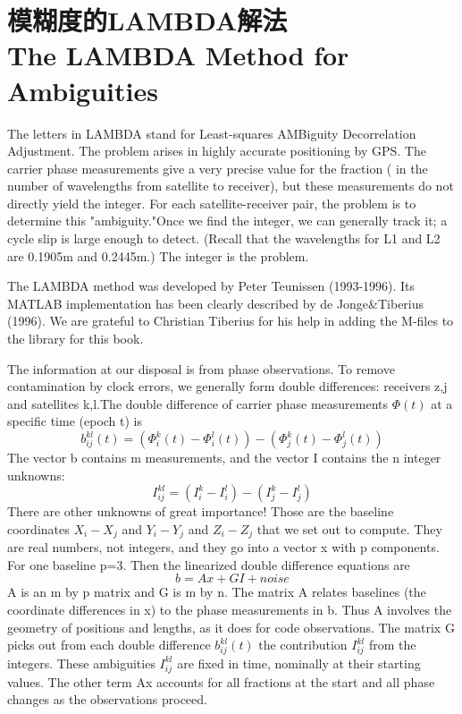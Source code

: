 \section[模糊度的LAMBDA解法]{模糊度的LAMBDA解法\\The LAMBDA Method for Ambiguities}
The letters in LAMBDA stand for Least-squares AMBiguity Decorrelation Adjustment. The problem arises in highly accurate positioning by GPS. The carrier phase measurements give a very precise value for the fraction ( in the number of wavelengths from satellite to receiver), but these measurements do not directly yield the integer. For each satellite-receiver pair, the problem is to determine this "ambiguity."Once we find the integer, we can generally track it; a cycle slip is large enough to detect. (Recall that the wavelengths for L1 and L2 are 0.1905m and 0.2445m.) The integer is the problem.

The LAMBDA method was developed by Peter Teunissen (1993-1996). Its MATLAB implementation has been clearly described by de Jonge\&Tiberius (1996). We are grateful to Christian Tiberius for his help in adding the M-files to the library for this book.

The information at our disposal is from phase observations. To remove contamination by clock errors, we generally form double differences: receivers z,j and satellites k,l.The double difference of carrier phase measurements $\Phi(t)$ at a specific time (epoch t) is
\begin{equation}
b_{ij}^{kl}(t)=(\Phi_{i}^{k}(t)-\Phi_{i}^{l}(t))-(\Phi_{j}^{k}(t)-\Phi_{j}^{l}(t))
\end{equation}
The vector b contains m measurements, and the vector I contains the n integer unknowns:
\begin{equation}
I_{ij}^{kl}=(I_{i}^{k}-I_{i}^{l})-(I_{j}^{k}-I_{j}^{l})
\end{equation}
There are other unknowns of great importance! Those are the baseline coordinates $X_{i}-X_{j}$ and $Y_{i}-Y_{j}$ and $Z_{i}-Z_{j}$ that we set out to compute. They are real numbers, not integers, and they go into a vector x with p components. For one baseline p=3. Then the linearized double difference equations are
\begin{equation}
b=Ax+GI+noise
\end{equation}
A is an m by p matrix and G is m by n. The matrix A relates baselines (the coordinate differences in x) to the phase measurements in b. Thus A involves the geometry of positions and lengths, as it does for code observations. The matrix G picks out from each double difference $b_{ij}^{kl}(t)$ the contribution $I_{ij}^{kl}$ from the integers. These ambiguities $I_{ij}^{kl}$ are fixed in time, nominally at their starting values. The other term Ax accounts for all fractions at the start and all phase changes as the observations proceed.

